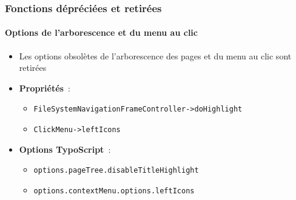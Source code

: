 
\begin{frame}[fragile]
	\frametitle{Fonctions dépréciées et retirées}
	\framesubtitle{Options de l'arborescence et du menu au clic}

	\begin{itemize}

		\item Les options obsolètes de l'arborescence des pages et du menu au clic sont retirées
		\item \textbf{Propriétés}~:

		\begin{itemize}
			\item \texttt{FileSystemNavigationFrameController->doHighlight}
			\item \texttt{ClickMenu->leftIcons}
		\end{itemize}

		\item \textbf{Options TypoScript}~:

		\begin{itemize}
			\item \texttt{options.pageTree.disableTitleHighlight}
			\item \texttt{options.contextMenu.options.leftIcons}
		\end{itemize}

	\end{itemize}

\end{frame}


